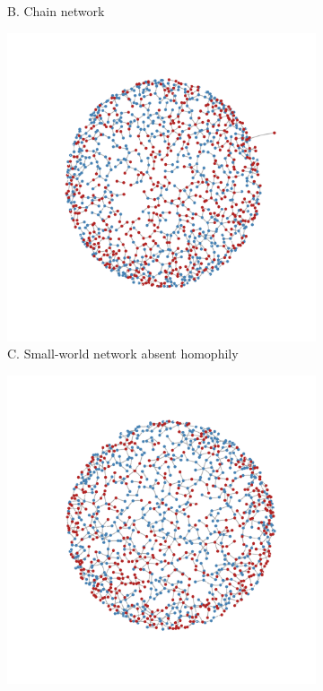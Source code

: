 \documentclass[man, 12pt, a4paper, nolmodern, noextraspace]{apa6}
\begin{document}
\begin{figure}
\begin{subfigure}[t]{0.45\textwidth}
        \caption*{B. Chain network} \label{fig1:tree}
    \end{subfigure}

    \vspace{1cm}
    \begin{subfigure}[t]{0.45\textwidth}
        \centering
        \includegraphics[trim={2cm 2cm 2cm 2cm}, clip, width=\linewidth]{draft/network_plots3.pdf} 
        \caption*{C. Small-world network absent homophily} \label{fig1:nohomophily}
    \end{subfigure}
    \hfill
    \begin{subfigure}[t]{0.45\textwidth}
        \centering
        \includegraphics[trim={2cm 2cm 2cm 2cm}, clip, width=\linewidth]{draft/network_plots4.pdf} 

\end{subfigure}
\end{figure}
\end{document}
